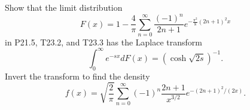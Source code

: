 Show that the limit distribution
\[
F(x) = 1 - \frac{4}{\pi} \sum_{n=0}^{\infty} \frac{(-1)^n}{2n+1} e^{-\frac{\pi^2}{8}(2n+1)^2 x}
\]
in P21.5, T23.2, and T23.3 has the Laplace transform
\[
\int_0^{\infty} e^{-sx} dF(x) = (\cosh\sqrt{2s})^{-1}.
\]
Invert the transform to find the density
\[
f(x) = \sqrt{\frac{2}{\pi}} \sum_{n=0}^{\infty} (-1)^n \frac{2n+1}{x^{3/2}} e^{-(2n+1)^2/(2x)}.
\]
